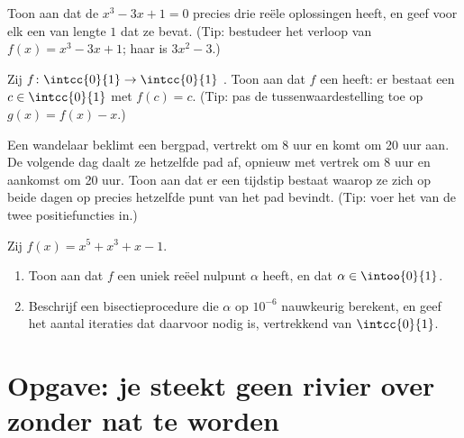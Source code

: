 \begin{exercise}[$\star\star$]\label{exo:g12:limcont:6}
Toon aan dat de  $x^3 - 3x + 1 = 0$ precies drie reële
oplossingen heeft, en geef voor elk een  van lengte $1$ dat ze
bevat. (Tip: bestudeer het verloop van $f(x) = x^3 - 3x + 1$; haar 
is $3x^2 - 3$.)
\end{exercise}

\begin{exercise}[$\star\star$]\label{exo:g12:limcont:7}
Zij $f \colon \intcc{0}{1} \to \intcc{0}{1}$ . Toon aan dat $f$ een
\emph{} heeft: er bestaat een $c \in \intcc{0}{1}$ met $f(c) = c$.
(Tip: pas de tussenwaardestelling toe op $g(x) = f(x) - x$.)
\end{exercise}

\begin{exercise}[$\star\star\star$]\label{exo:g12:limcont:8}
Een wandelaar beklimt een bergpad, vertrekt om 8 uur en komt om 20 uur aan.
De volgende dag daalt ze hetzelfde pad af, opnieuw met vertrek om 8 uur en
aankomst om 20 uur. Toon aan dat er een tijdstip bestaat waarop ze zich op
beide dagen op precies hetzelfde punt van het pad bevindt. (Tip: voer het
 van de twee positiefuncties in.)
\end{exercise}

\begin{exercise}[$\star\star\star$]\label{exo:g12:limcont:9}
Zij $f(x) = x^5 + x^3 + x - 1$.
\begin{enumerate}
  \item Toon aan dat $f$ een uniek reëel nulpunt $\alpha$ heeft, en dat
        $\alpha \in \intoo{0}{1}$.
  \item Beschrijf een bisectieprocedure die $\alpha$ op $10^{-6}$ nauwkeurig
        berekent, en geef het aantal iteraties dat daarvoor nodig is,
        vertrekkend van $\intcc{0}{1}$.
\end{enumerate}
\end{exercise}

\section{Opgave: je steekt geen rivier over zonder nat te worden}

